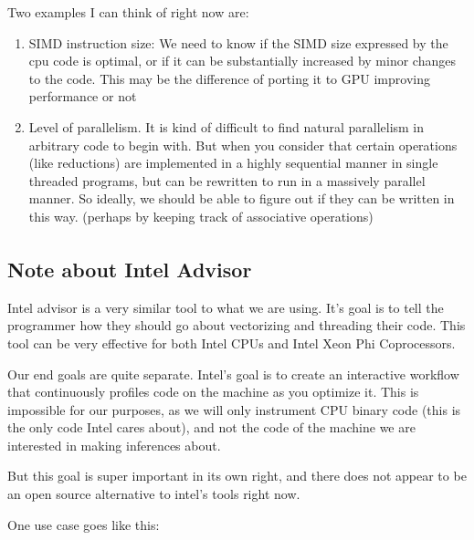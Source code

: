 \documentclass[12pt,twoside]{reedthesis}
\begin{document}
		Two examples I can think of right now are:
		
		\begin{enumerate}
			\item SIMD instruction size: We need to know if the SIMD size expressed by the cpu code is optimal, or if it can be substantially increased by minor changes to the code. This may be the difference of porting it to GPU improving performance or not
			
			\item Level of parallelism. It is kind of difficult to find natural parallelism in arbitrary code to begin with. But when you consider that certain operations (like reductions) are implemented in a highly sequential manner in single threaded programs, but can be rewritten to run in a massively parallel manner. So ideally, we should be able to figure out if they can be written in this way.  (perhaps by keeping track of associative operations)
		\end{enumerate}
		
		\subsection{Note about Intel\textsuperscript{\textregistered} Advisor}
		
		Intel advisor is a very similar tool to what we are using. It's goal is to tell the programmer how they should go about vectorizing and threading their code. This tool can be very effective for both Intel CPUs and Intel Xeon Phi Coprocessors. 
		
		Our end goals are quite separate. Intel's goal is to create an interactive workflow that continuously profiles code on the machine as you optimize it. This is impossible for our purposes, as we will only instrument CPU binary code (this is the only code Intel cares about), and not the code of the machine we are interested in making inferences about.  
		
		But this goal is super important in its own right, and there does not appear to be an open source alternative to intel's tools right now. 
		
		One use case goes like this:
		
\end{document}
